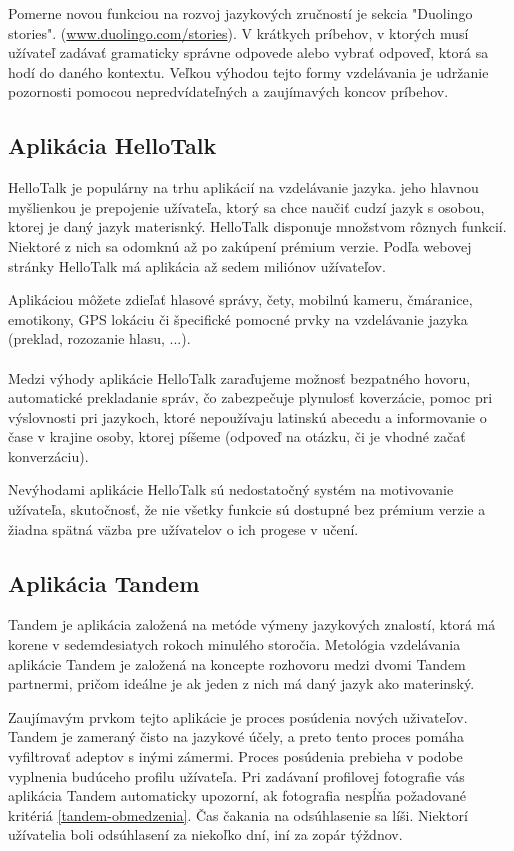 \documentclass[10pt,oneside,slovak,a4paper]{article}
\begin{document}
Pomerne novou funkciou na rozvoj jazykových zručností je sekcia "Duolingo stories". (\href{https://www.duolingo.com/stories/}{www.duolingo.com/stories}). V krátkych príbehov, v ktorých musí užívateľ zadávať gramaticky správne odpovede alebo vybrať odpoveď, ktorá sa hodí do daného kontextu. Veľkou výhodou tejto formy vzdelávania je udržanie pozornosti pomocou nepredvídateľných a zaujímavých koncov príbehov. 

\subsection{Aplikácia HelloTalk} %
HelloTalk je populárny na trhu aplikácií na vzdelávanie jazyka. jeho hlavnou myšlienkou je prepojenie užívateľa, ktorý sa chce naučiť cudzí jazyk s osobou, ktorej je daný jazyk materisnký. HelloTalk disponuje množstvom rôznych funkcií. Niektoré z nich sa odomknú až po zakúpení prémium verzie. Podľa webovej stránky HelloTalk má aplikácia až sedem miliónov užívateľov.\cite{hellotalk}

Aplikáciou môžete zdieľať hlasové správy, čety, mobilnú kameru, čmáranice, emotikony, GPS lokáciu či špecifické pomocné prvky na vzdelávanie jazyka (preklad, rozozanie hlasu, ...).\cite{hellotalk}\\\\

 Medzi výhody aplikácie HelloTalk zaraďujeme 
 možnosť bezpatného hovoru,
 automatické prekladanie správ, čo zabezpečuje plynulosť koverzácie,
 pomoc pri výslovnosti pri jazykoch, ktoré nepoužívaju latinskú abecedu a
 informovanie o čase v krajine osoby, ktorej píšeme (odpoveď na otázku, či je vhodné začať konverzáciu). \cite{hellotalk}

Nevýhodami aplikácie HelloTalk sú
 nedostatočný systém na motivovanie užívateľa, skutočnosť, že
 nie všetky funkcie sú dostupné bez prémium verzie a
 žiadna spätná väzba pre užívatelov o ich progese v učení. \cite{hellotalk}
\subsection{Aplikácia Tandem} %
Tandem je aplikácia založená na metóde výmeny jazykových znalostí, ktorá má korene v sedemdesiatych rokoch minulého storočia. Metológia vzdelávania aplikácie Tandem je založená na koncepte rozhovoru medzi dvomi Tandem partnermi, pričom ideálne je ak jeden z nich má daný jazyk ako materinský.

Zaujímavým prvkom tejto aplikácie je proces posúdenia nových uživateľov.\cite{tandem} Tandem je zameraný čisto na jazykové účely, a preto tento proces pomáha vyfiltrovať adeptov s inými zámermi. Proces posúdenia prebieha v podobe vyplnenia budúceho profilu užívateľa. Pri zadávaní profilovej fotografie vás aplikácia Tandem automaticky upozorní, ak fotografia nespĺňa požadované kritériá \ref{tandem-obmedzenia}. Čas čakania na odsúhlasenie sa líši. Niektorí užívatelia boli odsúhlasení za niekoľko dní, iní za zopár týždnov.
\end{document}
